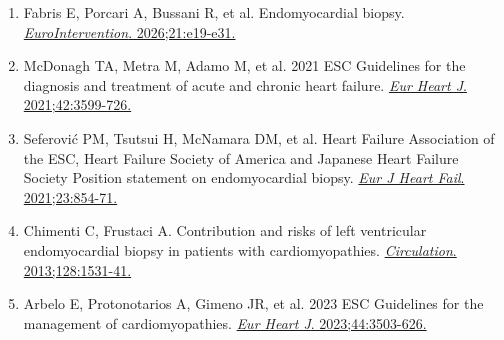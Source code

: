 \documentclass[12pt,a4paper]{article}
\begin{document}
\begin{enumerate}
    \item Fabris E, Porcari A, Bussani R, et al. Endomyocardial biopsy. \href{https://doi.org/10.4244/EIJ-D-25-00263}{\textit{EuroIntervention}. 2026;21:e19-e31.}

    \item McDonagh TA, Metra M, Adamo M, et al. 2021 ESC Guidelines for the diagnosis and treatment of acute and chronic heart failure. \href{https://doi.org/10.1093/eurheartj/ehab368}{\textit{Eur Heart J}. 2021;42:3599-726.}

    \item Seferović PM, Tsutsui H, McNamara DM, et al. Heart Failure Association of the ESC, Heart Failure Society of America and Japanese Heart Failure Society Position statement on endomyocardial biopsy. \href{https://doi.org/10.1002/ejhf.2190}{\textit{Eur J Heart Fail}. 2021;23:854-71.}

    \item Chimenti C, Frustaci A. Contribution and risks of left ventricular endomyocardial biopsy in patients with cardiomyopathies. \href{https://doi.org/10.1161/CIRCULATIONAHA.113.001779}{\textit{Circulation}. 2013;128:1531-41.}

    \item Arbelo E, Protonotarios A, Gimeno JR, et al. 2023 ESC Guidelines for the management of cardiomyopathies. \href{https://doi.org/10.1093/eurheartj/ehad194}{\textit{Eur Heart J}. 2023;44:3503-626.}
\end{enumerate}
\end{document}
